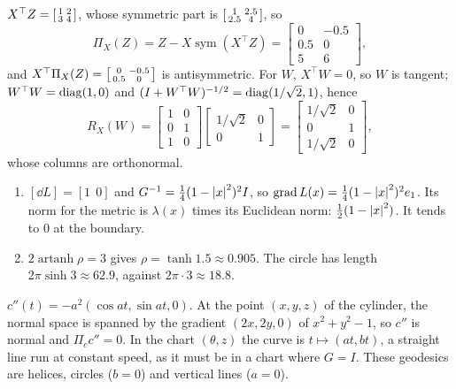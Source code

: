 $X^\top Z = \begin{bsmallmatrix}1 & 2\\ 3 & 4\end{bsmallmatrix}$, whose
symmetric part is
$\begin{bsmallmatrix}1 & 2.5\\ 2.5 & 4\end{bsmallmatrix}$, so
\[
  \Pi_X(Z) = Z - X\operatorname{sym}(X^\top Z)
  = \begin{bmatrix}0 & -0.5\\ 0.5 & 0\\ 5 & 6\end{bmatrix} ,
\]
and $X^\top\Pi_X(Z)
= \begin{bsmallmatrix}0 & -0.5\\ 0.5 & 0\end{bsmallmatrix}$ is
antisymmetric. For $W$, $X^\top W = 0$, so $W$ is tangent;
$W^\top W = \operatorname{diag}(1, 0)$ and
$(I + W^\top W)^{-1/2} = \operatorname{diag}(1/\sqrt2, 1)$, hence
\[
  R_X(W) = \begin{bmatrix}1 & 0\\ 0 & 1\\ 1 & 0\end{bmatrix}
  \begin{bmatrix}1/\sqrt2 & 0\\ 0 & 1\end{bmatrix}
  = \begin{bmatrix}1/\sqrt2 & 0\\ 0 & 1\\ 1/\sqrt2 & 0\end{bmatrix} ,
\]
whose columns are orthonormal.

\begin{enumerate}[nosep]
  \item $[\dd L] = [1\ \ 0]$ and $G^{-1} = \frac14(1 - \left|x\right|^2)^2I$, so
        $\operatorname{grad}L(x) = \frac14(1 - \left|x\right|^2)^2e_1$. Its norm
        for the metric is $\lambda(x)$ times its Euclidean norm:
        $\frac12(1 - \left|x\right|^2)$. It tends to $0$ at the boundary.
  \item $2\operatorname{artanh}\rho = 3$ gives
        $\rho = \tanh1.5\approx0.905$. The circle has length
        $2\pi\sinh3\approx62.9$, against $2\pi\cdot3\approx18.8$.
\end{enumerate}

$c''(t) = -a^2(\cos at, \sin at, 0)$. At the point $(x, y, z)$ of the
cylinder, the normal space is spanned by the gradient $(2x, 2y, 0)$ of
$x^2 + y^2 - 1$, so $c''$ is normal and $\Pi_cc'' = 0$. In the chart
$(\theta, z)$ the curve is $t\mapsto(at, bt)$, a straight line run at
constant speed, as it must be in a chart where $G = I$. These geodesics
are helices, circles ($b = 0$) and vertical lines ($a = 0$).

